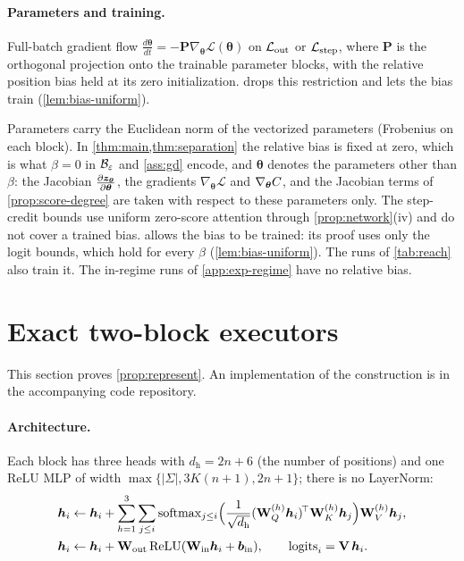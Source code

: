 \paragraph{Parameters and training.}

\begin{assumption}[Training]
\label{ass:gd}
Full-batch gradient flow $\tfrac{d\bm\theta}{dt}=-\mathbf P\nabla_{\bm\theta}\mathcal L(\bm\theta)$ on $\mathcal L_{\mathrm{out}}$ or $\mathcal L_{\mathrm{step}}$, where $\mathbf P$ is the orthogonal projection onto
the trainable parameter blocks, with the relative
position bias held at its zero initialization.  drops this restriction and lets the bias train (\cref{lem:bias-uniform}).
\end{assumption}

\label{rem:norms}Parameters carry the Euclidean norm of the vectorized parameters (Frobenius on
each block). In \cref{thm:main,thm:separation} the relative bias is fixed at zero, which is what $\beta=0$ in $\mathcal B_{\varepsilon}$ and
\cref{ass:gd} encode, and $\bm\theta$ denotes the parameters other than $\beta$: the Jacobian $\Jz$, the gradients $\nabla_{\bm\theta}\mathcal L$ and
$\nabla_{\bm\theta}C$, and the Jacobian terms of \cref{prop:score-degree} are taken with respect to these parameters only. The step-credit bounds use uniform
zero-score attention through \cref{prop:network}(iv) and do not cover a trained bias.  allows the bias to be
trained: its proof uses only the logit bounds, which hold for every $\beta$ (\cref{lem:bias-uniform}). The runs of \cref{tab:reach} also train it. The in-regime runs of \cref{app:exp-regime} have no relative bias.


\section{Exact two-block executors}
\label{app:architectures}

This section proves \cref{prop:represent}. An implementation of the construction is in the accompanying code repository.

\paragraph{Architecture.}
\label{app:construction}
\label{app:model}
Each block has three heads with $d_{\mathrm h}=2n+6$ (the number of positions) and one ReLU MLP of width $\max\{|\Sigma|,3K(n+1),2n+1\}$;
there is no LayerNorm:
\begin{align*}
 \bm h_i&\leftarrow \bm h_i+\sum_{h=1}^{3}\sum_{j\le i}\operatorname{softmax}_{j\le i}\Bigl(\tfrac{1}{\sqrt{d_{\mathrm h}}}(\mathbf W^{(h)}_Q\bm h_i)^{\!\top}\mathbf W^{(h)}_K\bm h_j\Bigr)\mathbf W^{(h)}_V\bm h_j,\\
 \bm h_i&\leftarrow \bm h_i+\mathbf W_{\mathrm{out}}\relu(\mathbf W_{\mathrm{in}}\bm h_i+\bm b_{\mathrm{in}}),\qquad \mathrm{logits}_i=\mathbf V\,\bm h_i .
\end{align*}

